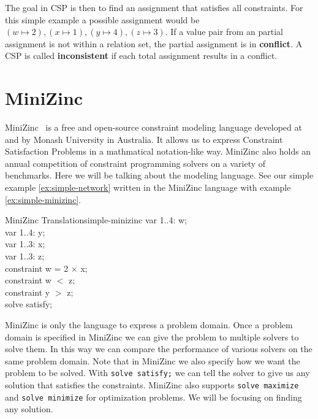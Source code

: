 The goal in CSP is then to find an assignment that satisfies all constraints. For this simple example a possible assignment would be $(w \mapsto 2), (x \mapsto 1), (y \mapsto 4), (z \mapsto 3)$. If a value pair from an partial assignment is not within a relation set, the partial assignment is in \textbf{conflict}. A CSP is called \textbf{inconsistent} if each total assignment results in a conflict.

\section{MiniZinc}

MiniZinc~\cite{minizinc:2007} is a free and open-source constraint modeling language developed at and by Monash University in Australia. It allows us to express Constraint Satisfaction Problems in a mathmatical notation-like way. MiniZinc also holds an annual competition of constraint programming solvers on a variety of benchmarks. Here we will be talking about the modeling language. See our simple example \ref{ex:simple-network} written in the MiniZinc language with example \ref{ex:simple-minizinc}.

\begin{example}{MiniZinc Translation}{simple-minizinc}
	var 1..4: w; \\
	var 1..4: y; \\
	var 1..3: x; \\
	var 1..3: z; \\

	constraint w = 2 $\times$ x; \\
	constraint w $<$ z; \\
	constraint y $>$ z; \\

	solve satisfy;
\end{example}

MiniZinc is only the language to express a problem domain. Once a problem domain is specified in MiniZinc we can give the problem to multiple solvers to solve them. In this way we can compare the performance of various solvers on the same problem domain. Note that in MiniZinc we also specify how we want the problem to be solved. With \verb|solve satisfy;| we can tell the solver to give us any solution that satisfies the constraints. MiniZinc also supports \verb|solve maximize| and \verb|solve minimize| for optimization problems. We will be focusing on finding any solution.

